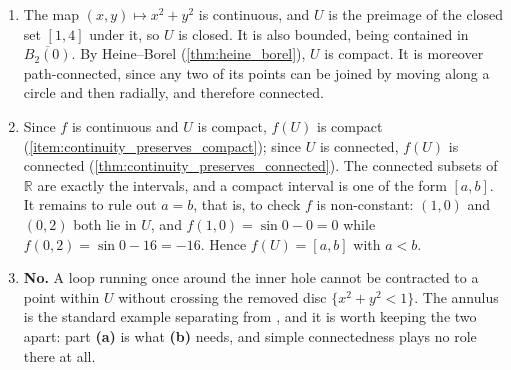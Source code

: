 \begin{exercisesolution}
\label{sol:annulus_continuous_image}
\begin{enumerate}[label=\textbf{(\alph*)}]
  \item The map $(x,y) \mapsto x^2+y^2$ is continuous, and $U$ is the preimage of the closed set
    $[1,4]$ under it, so $U$ is closed. It is also bounded, being contained in
    $\overline{B_2(0)}$. By Heine--Borel (\cref{thm:heine_borel}), $U$ is compact. It is moreover
    path-connected, since any two of its points can be joined by moving along a circle and then
    radially, and therefore connected.

  \item Since $f$ is continuous and $U$ is compact, $f(U)$ is compact
    (\cref{item:continuity_preserves_compact}); since $U$ is connected, $f(U)$ is connected
    (\cref{thm:continuity_preserves_connected}). The connected subsets of $\mathbb{R}$ are exactly
    the intervals, and a compact interval is one of the form $[a,b]$. It remains to rule out
    $a = b$, that is, to check $f$ is non-constant: $(1,0)$ and $(0,2)$ both lie in $U$, and
    $f(1,0) = \sin 0 - 0 = 0$ while $f(0,2) = \sin 0 - 16 = -16$. Hence $f(U) = [a,b]$ with $a < b$.

  \item \textbf{No.} A loop running once around the inner hole cannot be contracted to a point
    within $U$ without crossing the removed disc $\{x^2+y^2 < 1\}$. The annulus is the standard
    example separating  from , and it is worth keeping the two
    apart: part \textbf{(a)} is what \textbf{(b)} needs, and simple connectedness plays no role
    there at all.
\end{enumerate}
\end{exercisesolution}

